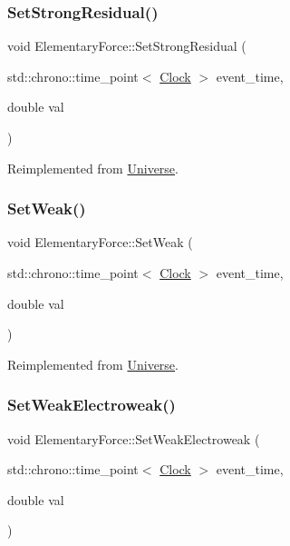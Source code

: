 \subsubsection{\texorpdfstring{Set\+Strong\+Residual()}{SetStrongResidual()}}
{\footnotesize\ttfamily void Elementary\+Force\+::\+Set\+Strong\+Residual (\begin{DoxyParamCaption}\item[{std\+::chrono\+::time\+\_\+point$<$ \mbox{\hyperlink{universe_8h_a0ef8d951d1ca5ab3cfaf7ab4c7a6fd80}{Clock}} $>$}]{event\+\_\+time,  }\item[{double}]{val }\end{DoxyParamCaption})\hspace{0.3cm}{\ttfamily [virtual]}}



Reimplemented from \mbox{\hyperlink{classUniverse_a1b2d6197ddf3d613cc30bd04d22ed8b7}{Universe}}.

\mbox{\label{classElementaryForce_a093cdf0810e95f1d973bd9dc88c6788b}} 
\subsubsection{\texorpdfstring{Set\+Weak()}{SetWeak()}}
{\footnotesize\ttfamily void Elementary\+Force\+::\+Set\+Weak (\begin{DoxyParamCaption}\item[{std\+::chrono\+::time\+\_\+point$<$ \mbox{\hyperlink{universe_8h_a0ef8d951d1ca5ab3cfaf7ab4c7a6fd80}{Clock}} $>$}]{event\+\_\+time,  }\item[{double}]{val }\end{DoxyParamCaption})\hspace{0.3cm}{\ttfamily [virtual]}}



Reimplemented from \mbox{\hyperlink{classUniverse_a0f5cd04081b41ee931c0557dc397f6fb}{Universe}}.

\mbox{\label{classElementaryForce_a38d4f86f18a9f84a4198ee43bc90f6b4}} 
\subsubsection{\texorpdfstring{Set\+Weak\+Electroweak()}{SetWeakElectroweak()}}
{\footnotesize\ttfamily void Elementary\+Force\+::\+Set\+Weak\+Electroweak (\begin{DoxyParamCaption}\item[{std\+::chrono\+::time\+\_\+point$<$ \mbox{\hyperlink{universe_8h_a0ef8d951d1ca5ab3cfaf7ab4c7a6fd80}{Clock}} $>$}]{event\+\_\+time,  }\item[{double}]{val }\end{DoxyParamCaption})\hspace{0.3cm}{\ttfamily [virtual]}}



